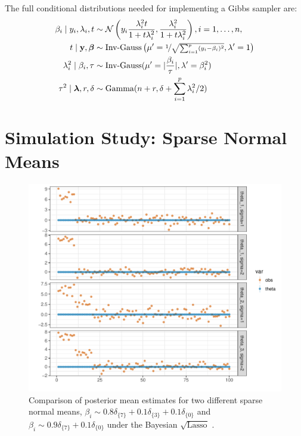\documentclass[11pt]{article}
\begin{document}
The full conditional distributions needed for implementing a Gibbs sampler are:	
\begin{align}
\beta_i \mid y_i, \lambda_i, t & \sim \mathcal{N} \left(y_i \frac{\lambda_i^2 t}{1 + t \lambda_i^2}, \frac{\lambda_i^2}{1 + t \lambda_i^2} \right), i = 1, \ldots, n, \\
t \mid {\bf y}, \boldsymbol{\beta} & \sim \text{Inv-Gauss} \left(\mu' = \nicefrac{1}{\sqrt{\sum_{i=1}^{p}(y_i - \beta_i)^2}}, \lambda' = 1 \right) \\
\lambda_i^2 \mid \beta_i, \tau & \sim \text{Inv-Gauss}(\mu' = \lvert\frac{\beta_i}{\tau}\rvert, \lambda' = \beta_i^2)\\
\tau^2 \mid \boldsymbol{\lambda}, r, \delta & \sim \text{Gamma}(n + r, \delta + \sum_{i=1}^{p} \lambda_i^2/2)
\end{align}


\section{Simulation Study: Sparse Normal Means}
\begin{figure}[!ht]%
\centering
\includegraphics[width=\columnwidth]{art/sparse-means-sql-1}%
\caption{Comparison of posterior mean estimates for two different sparse normal means, $\beta_i \sim 0.8 \delta_{\{7\}}+0.1\delta_{\{3\}}+0.1\delta_{\{0\}}$ and $\beta_i \sim 0.9 \delta_{\{7\}}+0.1\delta_{\{0\}}$ under the Bayesian $\sqrt{\text{Lasso}}$ . }%
\label{fig:sql-sim-1}%
\end{figure}
\end{document}
